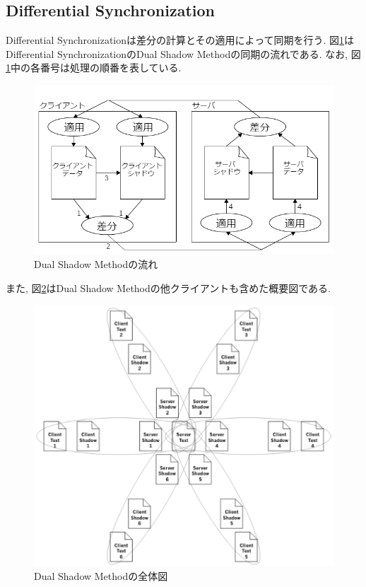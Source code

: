 \subsection{Differential Synchronization}
Differential Synchronizationは差分の計算とその適用によって同期を行う. 図\ref{DSfig}はDifferential SynchronizationのDual Shadow Methodの同期の流れである. なお, 図\ref{DSfig}中の各番号は処理の順番を表している.
\begin{figure}[htbp]
  \begin{center}
    \includegraphics[scale=0.7]{images/DS}
    \caption{Dual Shadow Methodの流れ}
    \label{DSfig}
  \end{center}
\end{figure}
また, 図\ref{DSCT}はDual Shadow Methodの他クライアントも含めた概要図である.
\begin{figure}[htbp]
  \begin{center}
    \includegraphics[scale=0.3]{images/DSCT}
    \caption{Dual Shadow Methodの全体図}
    \label{DSCT}
  \end{center}
\end{figure}
